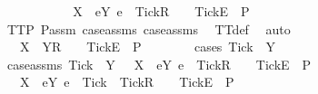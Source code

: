 \begin{isabellebody}
\ \ \ \ \ \ \isamarkupfalse%
\ \isamarkupfalse%
\ {\isachardoublequoteopen}{\isasymrho}\ {\isacharat}\ {\isacharbrackleft}X\ {\isasymunion}\ {\isacharbraceleft}e{\isasymin}Y{\isachardot}\ e\ {\isasymnoteq}\ Tick{\isacharbraceright}{\isacharbrackright}\isactrlsub R\ {\isacharhash}\ {\isasymsigma}{\isacharprime}\ {\isacharat}\ {\isacharbrackleft}{\isacharbrackleft}Tick{\isacharbrackright}\isactrlsub E{\isacharbrackright}\ {\isasymin}\ P{\isachardoublequoteclose}\isanewline
\ \ \ \ \ \ \ \ \isamarkupfalse%
\ TT{}{\isacharunderscore}P\ P{\isacharunderscore}assm{}\ case{\isacharunderscore}assms\ case{\isacharunderscore}assms{}\ \isamarkupfalse%
\ TT{}{\isacharunderscore}def\ \isamarkupfalse%
\ auto\isanewline
\ \ \ \ \ \ \isamarkupfalse%
\ \isamarkupfalse%
\ {\isachardoublequoteopen}{\isasymrho}\ {\isacharat}\ {\isacharbrackleft}X\ {\isasymunion}\ Y{\isacharbrackright}\isactrlsub R\ {\isacharhash}\ {\isasymsigma}{\isacharprime}\ {\isacharat}\ {\isacharbrackleft}{\isacharbrackleft}Tick{\isacharbrackright}\isactrlsub E{\isacharbrackright}\ {\isasymin}\ P{\isachardoublequoteclose}\isanewline
\ \ \ \ \ \ \isamarkupfalse%
\ {\isacharparenleft}cases\ {\isachardoublequoteopen}Tick\ {\isasymin}\ Y{\isachardoublequoteclose}{\isacharparenright}\isanewline
\ \ \ \ \ \ \ \ \isamarkupfalse%
\ case{\isacharunderscore}assms{}{\isacharcolon}\ {\isachardoublequoteopen}Tick\ {\isasymin}\ Y{\isachardoublequoteclose}\ {\isachardoublequoteopen}{\isasymrho}\ {\isacharat}\ {\isacharbrackleft}X\ {\isasymunion}\ {\isacharbraceleft}e{\isasymin}Y{\isachardot}\ e\ {\isasymnoteq}\ Tick{\isacharbraceright}{\isacharbrackright}\isactrlsub R\ {\isacharhash}\ {\isasymsigma}{\isacharprime}\ {\isacharat}\ {\isacharbrackleft}{\isacharbrackleft}Tick{\isacharbrackright}\isactrlsub E{\isacharbrackright}\ {\isasymin}\ P{\isachardoublequoteclose}\isanewline
\ \ \ \ \ \ \ \ \isamarkupfalse%
\ \isamarkupfalse%
\ {\isachardoublequoteopen}{\isasymrho}\ {\isacharat}\ {\isacharbrackleft}X\ {\isasymunion}\ {\isacharbraceleft}e{\isasymin}Y{\isachardot}\ e\ {\isasymnoteq}\ Tick{\isacharbraceright}\ {\isasymunion}\ {\isacharbraceleft}Tick{\isacharbraceright}{\isacharbrackright}\isactrlsub R\ {\isacharhash}\ {\isasymsigma}{\isacharprime}\ {\isacharat}\ {\isacharbrackleft}{\isacharbrackleft}Tick{\isacharbrackright}\isactrlsub E{\isacharbrackright}\ {\isasymin}\ P{\isachardoublequoteclose}\isanewline

\end{isabellebody}
